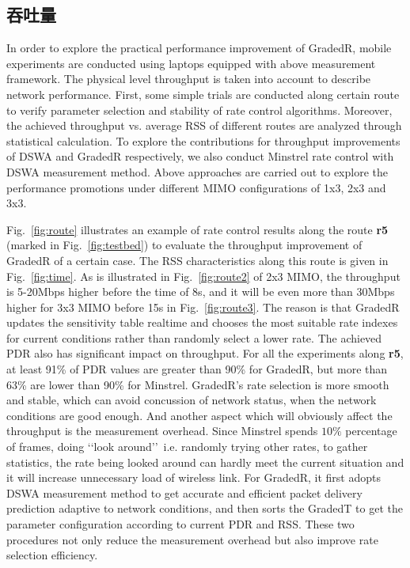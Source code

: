 \subsection{吞吐量}
\label{sec:throughput}

In order to explore the practical performance improvement of GradedR, mobile experiments are conducted using laptops equipped with above measurement framework. The physical level throughput is taken into account to describe network performance. First, some simple trials are conducted along certain route to verify parameter selection and stability of rate control algorithms. Moreover, the achieved throughput vs. average RSS of different routes are analyzed through statistical calculation. To explore the contributions for throughput improvements of DSWA and GradedR respectively, we also conduct Minstrel rate control with DSWA measurement method. Above approaches are carried out to explore the performance promotions under different MIMO configurations of 1x3, 2x3 and 3x3.

Fig.~\ref{fig:route} illustrates an example of rate control results along the route \textbf{r5} (marked in Fig.~\ref{fig:testbed}) to evaluate the throughput improvement of GradedR of a certain case. The RSS characteristics along this route is given in Fig.~\ref{fig:time}. As is illustrated in Fig.~\ref{fig:route2} of 2x3 MIMO, the throughput is 5-20Mbps higher before the time of 8s, and it will be even more than 30Mbps higher for 3x3 MIMO before 15s in Fig.~\ref{fig:route3}. The reason is that GradedR updates the sensitivity table realtime and chooses the most suitable rate indexes for current conditions rather than randomly select a lower rate. The achieved PDR also has significant impact on throughput. For all the experiments along \textbf{r5}, at least 91\% of PDR values are greater than 90\% for GradedR, but more than 63\% are lower than 90\% for Minstrel. GradedR's rate selection is more smooth and stable, which can avoid concussion of network status, when the network conditions are good enough. And another aspect which will obviously affect the throughput is the measurement overhead. Since Minstrel spends $10\%$ percentage of frames, doing \lq\lq look around\rq\rq~i.e. randomly trying other rates, to gather statistics, the rate being looked around can hardly meet the current situation and it will increase unnecessary load of wireless link. For GradedR, it first adopts DSWA measurement method to get accurate and efficient packet delivery prediction adaptive to network conditions, and then sorts the GradedT to get the parameter configuration according to current PDR and RSS. These two procedures not only reduce the measurement overhead but also improve rate selection efficiency.

